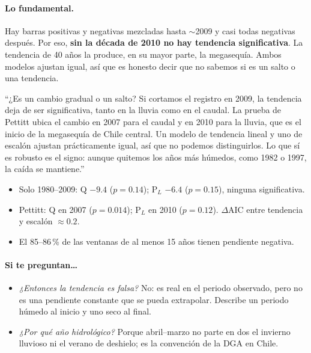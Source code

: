 \documentclass[11pt,letterpaper]{article}
\begin{document}
\paragraph{Lo fundamental.} Hay barras positivas y negativas mezcladas hasta $\sim$2009 y casi todas
negativas después. Por eso, \textbf{sin la década de 2010 no hay tendencia significativa}. La tendencia de
40 años la produce, en su mayor parte, la megasequía. Ambos modelos ajustan igual, así que es honesto decir
que no sabemos si es un salto o una tendencia.

\begin{guion}
``¿Es un cambio gradual o un salto? Si cortamos el registro en 2009, la tendencia deja de ser significativa,
tanto en la lluvia como en el caudal. La prueba de Pettitt ubica el cambio en 2007 para el caudal y en 2010
para la lluvia, que es el inicio de la megasequía de Chile central. Un modelo de tendencia lineal y uno de
escalón ajustan prácticamente igual, así que no podemos distinguirlos. Lo que sí es robusto es el signo:
aunque quitemos los años más húmedos, como 1982 o 1997, la caída se mantiene.''
\end{guion}

\begin{cifras}
\begin{itemize}
\item Solo 1980--2009: Q $-9.4$ ($p=0.14$); P$_L$ $-6.4$ ($p=0.15$), ninguna significativa.
\item Pettitt: Q en 2007 ($p=0.014$); P$_L$ en 2010 ($p=0.12$). $\Delta$AIC entre tendencia y escalón $\approx0.2$.
\item El 85--86\,\% de las ventanas de al menos 15 años tienen pendiente negativa.
\end{itemize}
\end{cifras}

\paragraph{Si te preguntan\ldots}
\begin{itemize}
\item \emph{¿Entonces la tendencia es falsa?} No: es real en el periodo observado, pero no es una pendiente
constante que se pueda extrapolar. Describe un periodo húmedo al inicio y uno seco al final.
\item \emph{¿Por qué año hidrológico?} Porque abril--marzo no parte en dos el invierno lluvioso ni el verano de
deshielo; es la convención de la DGA en Chile.
\end{itemize}
\end{document}
